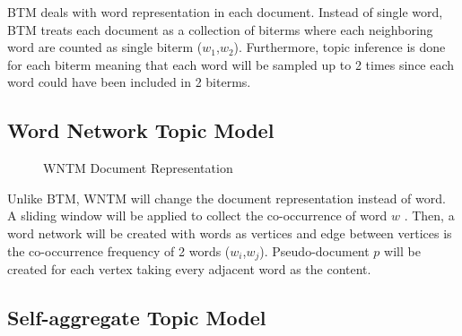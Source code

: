 \documentclass[senior]{IPSstyle}
\begin{document}
BTM deals with word representation in each document. Instead of single word, BTM treats each document as a collection of biterms where each neighboring word are counted as single biterm ($w_1$,$w_2$). Furthermore, topic inference is done for each biterm meaning that each word will be sampled up to 2 times since each word could have been included in 2 biterms.

\subsection{Word Network Topic Model~\cite{zuo}}

\begin{figure}[h]
	\centering
	\caption{WNTM Document Representation}
\label{fig_wntm}
\end{figure}

Unlike BTM, WNTM will change the document representation instead of word. A sliding window will be applied to collect the co-occurrence of word $w$ . Then, a word network will be created with words as vertices and edge between vertices is the co-occurrence frequency of 2 words ($w_i$,$w_j$). Pseudo-document $p$ will be created for each vertex taking every adjacent word as the content.

\subsection{Self-aggregate Topic Model~\cite{quan}}
\end{document}
